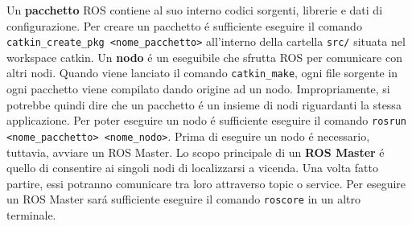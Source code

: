 Un \textbf{pacchetto} ROS contiene al suo interno codici sorgenti, librerie e dati di configurazione.
Per creare un pacchetto \'{e} sufficiente eseguire il comando \\
\verb|catkin_create_pkg <nome_pacchetto>| all'interno della cartella \verb|src/| situata nel workspace catkin.
Un \textbf{nodo} \'{e} un eseguibile che sfrutta ROS per comunicare con altri nodi.
Quando viene lanciato il comando \verb|catkin_make|, ogni file sorgente in ogni pacchetto viene compilato 
dando origine ad un nodo.
Impropriamente, si potrebbe quindi dire che un pacchetto \'{e} un insieme di nodi riguardanti la stessa applicazione.
Per poter eseguire un nodo \'{e} sufficiente eseguire il comando \verb|rosrun <nome_pacchetto> <nome_nodo>|. 
Prima di eseguire un nodo \'{e} necessario, tuttavia, avviare un ROS Master.
Lo scopo principale di un \textbf{ROS Master} \'{e} quello di consentire ai singoli nodi di localizzarsi a vicenda. Una volta 
fatto partire, essi potranno comunicare tra loro attraverso topic o service.
Per eseguire un ROS Master sar\'{a} sufficiente eseguire il comando \verb|roscore| in un altro terminale.
